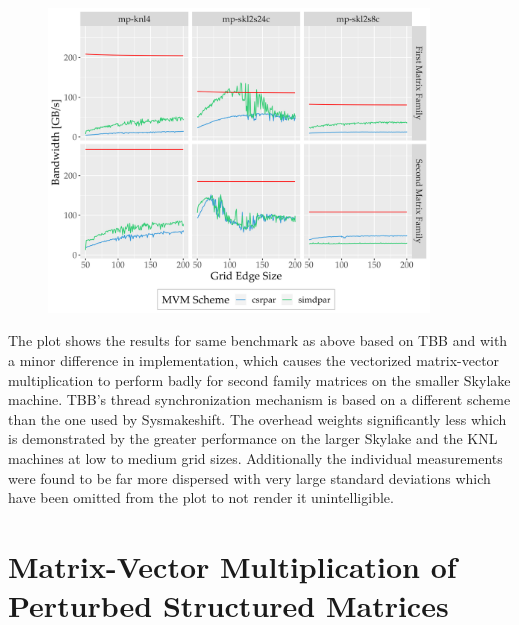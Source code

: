      \begin{figure}[H]
       \centering
       \captionsetup{width=0.9\textwidth}
       \includegraphics[width=0.9\textwidth]{assets/mvm-perturbed-old}
       \label{fig:mvm-perturbed-old}
     \end{figure}
 
     The plot shows the results for same benchmark as above based on TBB and with a minor difference in implementation,
     which causes the vectorized matrix-vector multiplication to perform badly for second family matrices on the smaller
     Skylake machine. TBB's thread synchronization mechanism is based on a different scheme than the one used by
     Sysmakeshift. The overhead weights significantly less which is demonstrated by the greater performance on the larger
     Skylake and the KNL machines at low to medium grid sizes. Additionally the individual measurements were found to be
     far more dispersed with very large standard deviations which have been omitted from the plot to not render it
     unintelligible.
 
  \section{Matrix-Vector Multiplication of Perturbed Structured Matrices} \label{sec:mvm-perturbed}

